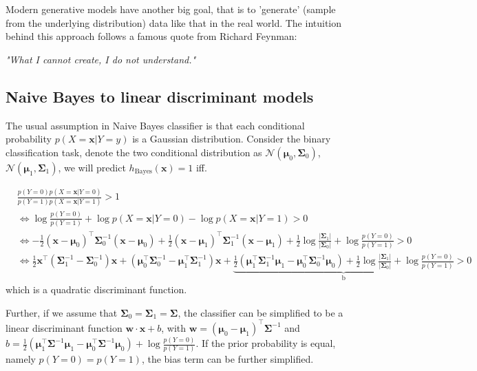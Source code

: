 \documentclass{article}
\begin{document}
	Modern generative models have another big goal, that is to 'generate' (sample from the underlying distribution) data like that in the real world. The intuition behind this approach follows a famous quote from Richard Feynman:	
	\begin{center}
	\textit{"What I cannot create, I do not understand."}
	\end{center}

	\subsection{Naive Bayes to linear discriminant models}
	The usual assumption in Naive Bayes classifier is that each conditional probability $p(X=\bm{x}|Y=y)$ is a Gaussian distribution. Consider the binary classification task, denote the two conditional distribution as $\mathcal{N}(\bm{\mu}_0,\bm{\Sigma}_0)$, $\mathcal{N}(\bm{\mu}_1,\bm{\Sigma}_1)$, we will predict $h_{\mathrm{Bayes}}(\bm{x})=1$ iff.
	
	\begin{equation*}
	\begin{split}
	&\frac{p(Y=0) p(X=\bm{x}|Y=0)}{p(Y=1) p(X=\bm{x}|Y=1)} > 1 \\
	&\iff \log \frac{p(Y=0)}{p(Y=1)} + \log p(X=\bm{x}|Y=0) - \log p(X=\bm{x}|Y=1) > 0 \\
	&\iff -\frac{1}{2}(\bm{x}-\bm{\mu}_0)^\top \bm{\Sigma}_0^{-1}(\bm{x}-\bm{\mu}_0) + \frac{1}{2}(\bm{x}-\bm{\mu}_1)^\top \bm{\Sigma}_1^{-1}(\bm{x}-\bm{\mu}_1) +  \frac{1}{2}\log\frac{|\bm{\Sigma}_1|}{|\bm{\Sigma}_0|} + \log \frac{p(Y=0)}{p(Y=1)} > 0 \\
	&\iff \frac{1}{2} \bm{x}^\top ( \bm{\Sigma}_1^{-1} - \bm{\Sigma}_0^{-1}) \bm{x} + (\bm{\mu}_0^\top\bm{\Sigma}_0^{-1} - \bm{\mu}_1^\top\bm{\Sigma}_1^{-1}) \bm{x} + \underbrace{\frac{1}{2} (\bm{\mu}_1^\top\bm{\Sigma}_1^{-1}\bm{\mu}_1 - \bm{\mu}_0^\top\bm{\Sigma}_0^{-1}\bm{\mu}_0 ) + \frac{1}{2}\log\frac{|\bm{\Sigma}_1|}{|\bm{\Sigma}_0|} + \log \frac{p(Y=0)}{p(Y=1)}}_{\mathrm{b}} > 0
	\end{split}
	\end{equation*}
which is a quadratic discriminant function.

	Further, if we assume that $\bm{\Sigma}_0=\bm{\Sigma}_1=\bm{\Sigma}$, the classifier can be simplified to be a linear discriminant function $\bm{w}\cdot\bm{x}+b$, with $\bm{w}=(\bm{\mu}_0 - \bm{\mu}_1)^\top\bm{\Sigma}^{-1}$ and $b=\frac{1}{2} (\bm{\mu}_1^\top\bm{\Sigma}^{-1}\bm{\mu}_1 - \bm{\mu}_0^\top\bm{\Sigma}^{-1}\bm{\mu}_0 ) + \log \frac{p(Y=0)}{p(Y=1)}$. If the prior probability is equal, namely $p(Y=0)=p(Y=1)$, the bias term can be further simplified.
	
\end{document}
